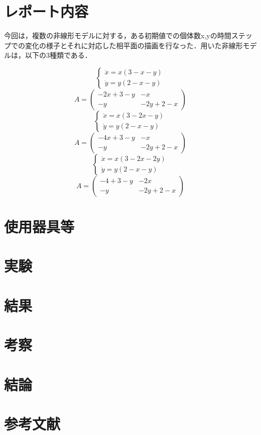 \documentclass[10pt, a4paper]{jsarticle}
\begin{document}
\tableofcontents %
\newpage

\section{レポート内容}
今回は，複数の非線形モデルに対する，ある初期値での個体数x,yの時間ステップでの変化の様子とそれに対応した相平面の描画を行なった．用いた非線形モデルは，以下の3種類である．

	\begin{equation}
	\begin{cases}
		\dot{x} = x \left(3-x-y \right) \\
		\dot{y} = y \left(2-x-y \right)
	\end{cases}
	\end{equation}
	\begin{equation}
		A = \begin{pmatrix}
			-2x+3-y & -x \\
			-y & -2y+2-x
			\end{pmatrix}
	\end{equation}
	\begin{equation}
	\begin{cases}
		\dot{x} = x \left(3-2x-y \right) \\
		\dot{y} = y \left(2-x-y \right)
	\end{cases}
	\end{equation}
	\begin{equation}
		A = \begin{pmatrix}
			-4x+3-y & -x \\
			-y & -2y+2-x
			\end{pmatrix}
	\end{equation}
	\begin{equation}
	\begin{cases}
		\dot{x} = x \left(3-2x-2y \right) \\
		\dot{y} = y \left(2-x-y \right)
	\end{cases}
	\end{equation}
	\begin{equation}
		A = \begin{pmatrix}
			-4+3-y & -2x \\
			-y & -2y+2-x
			\end{pmatrix}
	\end{equation}




\section{使用器具等} 
\section{実験} 
\section{結果}
\section{考察}
\section{結論}
\section{参考文献}
\end{document}
